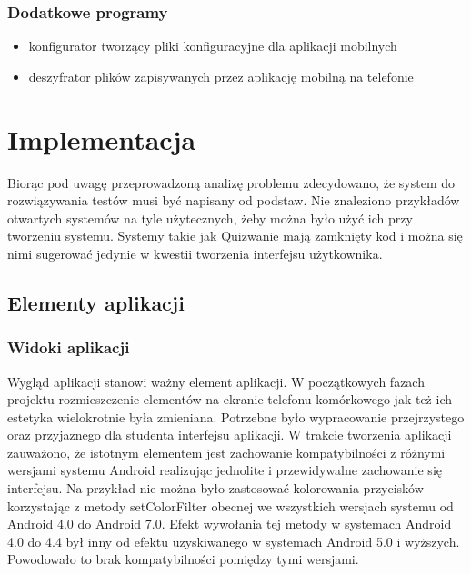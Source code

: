 \documentclass[eng]{mgr}
\begin{document}
			\subsection{Dodatkowe programy}
			\begin{itemize}
				\item konfigurator tworzący pliki konfiguracyjne dla aplikacji mobilnych
				\item deszyfrator plików zapisywanych przez aplikację mobilną na telefonie
			\end{itemize}
	
	\chapter{Implementacja}
	
	Biorąc pod uwagę przeprowadzoną analizę problemu zdecydowano, że system do rozwiązywania testów musi być napisany od podstaw. Nie znaleziono przykładów otwartych systemów na tyle użytecznych, żeby można było użyć ich przy tworzeniu systemu. Systemy takie jak Quizwanie mają zamknięty kod i można się nimi sugerować jedynie w kwestii tworzenia interfejsu użytkownika.
	
		\section{Elementy aplikacji}
	
			\subsection{Widoki aplikacji}
		
			Wygląd aplikacji stanowi ważny element aplikacji. W początkowych fazach projektu rozmieszczenie elementów na ekranie telefonu komórkowego jak też ich estetyka wielokrotnie była zmieniana. Potrzebne było wypracowanie przejrzystego oraz przyjaznego dla studenta interfejsu aplikacji. W trakcie tworzenia aplikacji zauważono, że istotnym elementem jest zachowanie kompatybilności z różnymi wersjami systemu Android realizując jednolite i przewidywalne zachowanie się interfejsu.
			Na przykład nie można było zastosować kolorowania przycisków korzystając z metody setColorFilter obecnej we wszystkich wersjach systemu od Android 4.0 do Android 7.0. Efekt wywołania tej metody w systemach Android 4.0 do 4.4 był inny od efektu uzyskiwanego w systemach Android 5.0 i wyższych. Powodowało to brak kompatybilności pomiędzy tymi wersjami.\\
		
\end{document}
